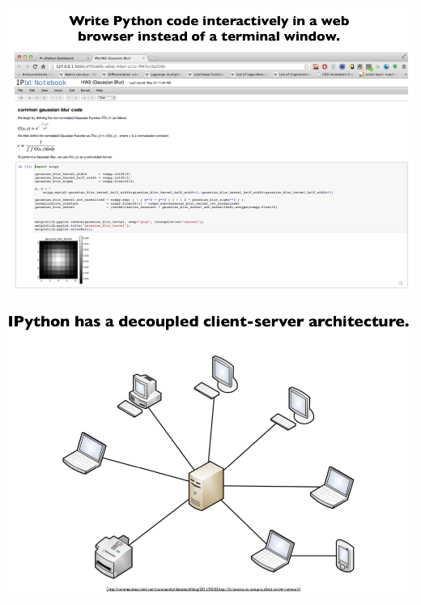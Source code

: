 \documentclass{beamer}
\begin{document}
\begin{frame}{}
    \begin{center}
        \includegraphics[scale=0.3]{ipythonWeb.png}
    \end{center}
\end{frame}
\begin{frame}{}
    \begin{center}
        \includegraphics[scale=0.3]{ipythonArch.png}
    \end{center}
\end{frame}
\end{document}
